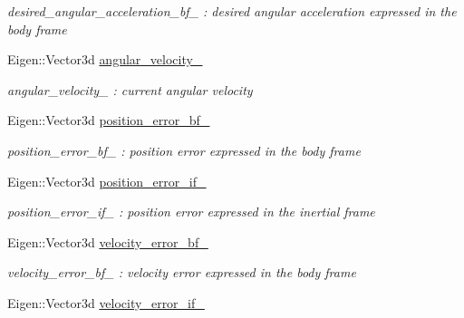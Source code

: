 \begin{DoxyCompactItemize}
\begin{DoxyCompactList}\small\item\em desired\-\_\-angular\-\_\-acceleration\-\_\-bf\-\_\- \-: desired angular acceleration expressed in the body frame \end{DoxyCompactList}\item 
\hypertarget{class_skye_geometric_controller_a6fcf8fba87d817dc4a810f58181af3bd}{Eigen\-::\-Vector3d \hyperlink{class_skye_geometric_controller_a6fcf8fba87d817dc4a810f58181af3bd}{angular\-\_\-velocity\-\_\-}}\label{class_skye_geometric_controller_a6fcf8fba87d817dc4a810f58181af3bd}

\begin{DoxyCompactList}\small\item\em angular\-\_\-velocity\-\_\- \-: current angular velocity \end{DoxyCompactList}\item 
\hypertarget{class_skye_geometric_controller_ac10c49d384af4459536ab57b2e9cdb78}{Eigen\-::\-Vector3d \hyperlink{class_skye_geometric_controller_ac10c49d384af4459536ab57b2e9cdb78}{position\-\_\-error\-\_\-bf\-\_\-}}\label{class_skye_geometric_controller_ac10c49d384af4459536ab57b2e9cdb78}

\begin{DoxyCompactList}\small\item\em position\-\_\-error\-\_\-bf\-\_\- \-: position error expressed in the body frame \end{DoxyCompactList}\item 
\hypertarget{class_skye_geometric_controller_acd03c7812282264775fbe6631fe9a654}{Eigen\-::\-Vector3d \hyperlink{class_skye_geometric_controller_acd03c7812282264775fbe6631fe9a654}{position\-\_\-error\-\_\-if\-\_\-}}\label{class_skye_geometric_controller_acd03c7812282264775fbe6631fe9a654}

\begin{DoxyCompactList}\small\item\em position\-\_\-error\-\_\-if\-\_\- \-: position error expressed in the inertial frame \end{DoxyCompactList}\item 
\hypertarget{class_skye_geometric_controller_a46518f2a2b6f391adff90103934bd931}{Eigen\-::\-Vector3d \hyperlink{class_skye_geometric_controller_a46518f2a2b6f391adff90103934bd931}{velocity\-\_\-error\-\_\-bf\-\_\-}}\label{class_skye_geometric_controller_a46518f2a2b6f391adff90103934bd931}

\begin{DoxyCompactList}\small\item\em velocity\-\_\-error\-\_\-bf\-\_\- \-: velocity error expressed in the body frame \end{DoxyCompactList}\item 
\hypertarget{class_skye_geometric_controller_a9d0bb68188a2712f62804a14c56f4110}{Eigen\-::\-Vector3d \hyperlink{class_skye_geometric_controller_a9d0bb68188a2712f62804a14c56f4110}{velocity\-\_\-error\-\_\-if\-\_\-}}\label{class_skye_geometric_controller_a9d0bb68188a2712f62804a14c56f4110}


\end{DoxyCompactItemize}
